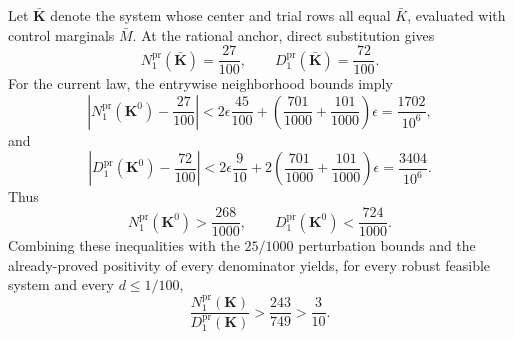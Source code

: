 Let \(\bar{\mathbf K}\) denote the system whose center and trial rows all equal \(\bar K\), evaluated with control marginals \(\bar M\). At the rational anchor, direct substitution gives
\[
 N_1^{\mathrm{pr}}(\bar{\mathbf K})=\frac{27}{100},
 \qquad
 D_1^{\mathrm{pr}}(\bar{\mathbf K})=\frac{72}{100}.
\]
For the current law, the entrywise neighborhood bounds imply
\[
 \left|N_1^{\mathrm{pr}}(\mathbf K^0)-\frac{27}{100}\right|
 <2\epsilon\frac{45}{100}
   +\left(\frac{701}{1000}+\frac{101}{1000}\right)\epsilon
 =\frac{1702}{10^6},
\]
and
\[
 \left|D_1^{\mathrm{pr}}(\mathbf K^0)-\frac{72}{100}\right|
 <2\epsilon\frac9{10}
   +2\left(\frac{701}{1000}+\frac{101}{1000}\right)\epsilon
 =\frac{3404}{10^6}.
\]
Thus
\[
 N_1^{\mathrm{pr}}(\mathbf K^0)>\frac{268}{1000},
 \qquad
 D_1^{\mathrm{pr}}(\mathbf K^0)<\frac{724}{1000}.
\]
Combining these inequalities with the \(25/1000\) perturbation bounds and the already-proved positivity of every denominator yields, for every robust feasible system and every \(d\le1/100\),
\[
 \frac{N_1^{\mathrm{pr}}(\mathbf K)}{D_1^{\mathrm{pr}}(\mathbf K)}
 >\frac{243}{749}>\frac3{10}.
\]

